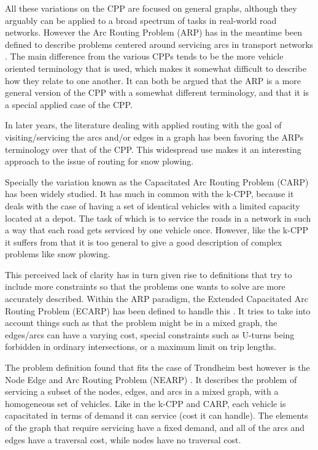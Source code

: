 All these variations on the CPP are focused on general graphs, although they arguably can be applied to a broad spectrum of tasks in real-world road networks. However the Arc Routing Problem (ARP) has in the meantime been defined to describe problems centered around servicing arcs in transport networks \citep{eiselt1995ARP}. The main difference from the various CPPs tends to be the more vehicle oriented terminology that is used, which makes it somewhat difficult to describe how they relate to one another. It can both be argued that the ARP is a more general version of the CPP with a somewhat different terminology, and that it is a special applied case of the CPP.

In later years, the literature dealing with applied routing with the goal of visiting/servicing the arcs and/or edges in a graph has been favoring the ARPs terminology over that of the CPP. This widespread use makes it an interesting approach to the issue of routing for snow plowing.

Specially the variation known as the Capacitated Arc Routing Problem (CARP) \citep{ulusoy1985CARP} has been widely studied. It has much in common with the k-CPP, because it deals with the case of having a set of identical vehicles with a limited capacity located at a depot. The task of which is to service the roads in a network in such a way that each road gets serviced by one vehicle once. However, like the k-CPP it suffers from that it is too general to give a good description of complex problems like snow plowing.

This perceived lack of clarity has in turn given rise to definitions that try to include more constraints so that the problems one wants to solve are more accurately described. Within the ARP paradigm, the Extended Capacitated Arc Routing Problem (ECARP) has been defined to handle this \citep{lacomme2004competitiveMA}. It tries to take into account things such as that the problem might be in a mixed graph, the edges/arcs can have a varying cost, special constraints such as U-turns being forbidden in ordinary intersections, or a maximum limit on trip lengths.

The problem definition found that fits the case of Trondheim best however is the Node Edge and Arc Routing Problem (NEARP) \citep{prins2005memeticNEARP}. It describes the problem of servicing a subset of the nodes, edges, and arcs in a mixed graph, with a homogeneous set of vehicles. Like in the k-CPP and CARP, each vehicle is capacitated in terms of demand it can service (cost it can handle). The elements of the graph that require servicing have a fixed demand, and all of the arcs and edges have a traversal cost, while nodes have no traversal cost.

